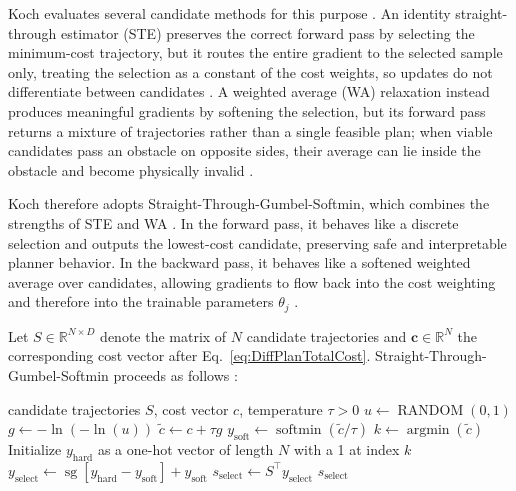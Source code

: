 Koch evaluates several candidate methods for this purpose \cite{koch_DifferentiableInterpretablePath_2025}.
An identity straight-through estimator (STE) preserves the correct forward pass by selecting the minimum-cost trajectory, but it routes the entire gradient to the selected sample only, treating the selection as a constant of the cost weights, so updates do not differentiate between candidates \cite{bengio_EstimatingPropagatingGradients_2013}.
A weighted average (WA) relaxation instead produces meaningful gradients by softening the selection, but its forward pass returns a mixture of trajectories rather than a single feasible plan; when viable candidates pass an obstacle on opposite sides, their average can lie inside the obstacle and become physically invalid \cite{koch_DifferentiableInterpretablePath_2025}.

Koch therefore adopts Straight-Through-Gumbel-Softmin, which combines the strengths of STE and WA \cite{koch_DifferentiableInterpretablePath_2025, jang_CategoricalReparameterizationGumbel_2017, maddison_ConcreteDistributionContinuous_2017}.
In the forward pass, it behaves like a discrete selection and outputs the lowest-cost candidate, preserving safe and interpretable planner behavior.
In the backward pass, it behaves like a softened weighted average over candidates, allowing gradients to flow back into the cost weighting and therefore into the trainable parameters $\theta_j$ \cite{koch_DifferentiableInterpretablePath_2025}.

Let $S \in \mathbb{R}^{N \times D}$ denote the matrix of $N$ candidate trajectories and $\mathbf{c} \in \mathbb{R}^{N}$ the corresponding cost vector after Eq.~\eqref{eq:DiffPlanTotalCost}.
Straight-Through-Gumbel-Softmin proceeds as follows \cite{koch_DifferentiableInterpretablePath_2025}:

\begin{algorithm}[ht!]
\caption{Differentiable Sample Selection}
    \begin{algorithmic}[1]
    \Require candidate trajectories $S$, cost vector $c$, temperature $\tau > 0$
    \State $u \gets \operatorname{RANDOM}(0, 1)$ 
    \State $g \gets - \ln (- \ln (u))$
    \State $\tilde{c} \gets c + \tau g$
    \State $y_{\text{soft}} \gets \operatorname{softmin}(\tilde{c}/\tau)$
    \State $k \gets \operatorname{argmin}(\tilde{c})$
    \State Initialize $y_{\text{hard}}$ as a one-hot vector of length $N$ with a 1 at index $k$
    \State $y_{\text{select}} \gets \operatorname{sg}[y_{\text{hard}} - y_{\text{soft}}] + y_{\text{soft}}$ 
    \State $s_{\text{select}} \gets S^{\top} y_{\text{select}}$
    \State \Return $s_{\text{select}}$
\end{algorithmic}
\end{algorithm}


